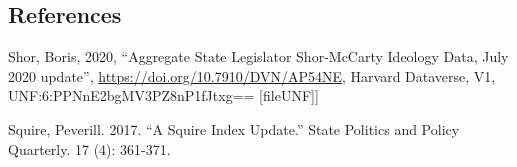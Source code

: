 \documentclass[
]{article}
\begin{document}
\newpage

\hypertarget{references}{%
\subsection*{References}\label{references}}

Shor, Boris, 2020, ``Aggregate State Legislator Shor-McCarty Ideology Data, July 2020 update'', \url{https://doi.org/10.7910/DVN/AP54NE}, Harvard Dataverse, V1, UNF:6:PPNnE2bgMV3PZ8nP1fJtxg== {[}fileUNF{]}{]}

Squire, Peverill. 2017. ``A Squire Index Update.'' State Politics and Policy Quarterly. 17 (4):
361-371.
\end{document}
